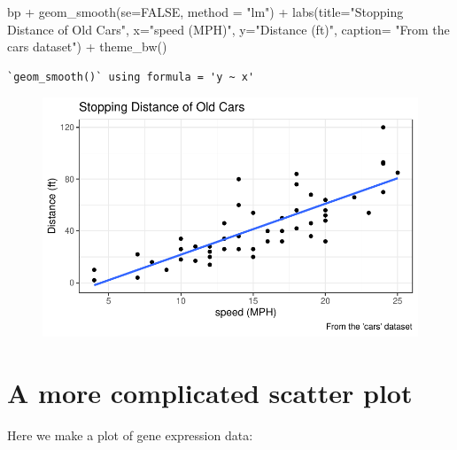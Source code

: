 \documentclass[
  letterpaper,
  DIV=11,
  numbers=noendperiod]{scrartcl}
\newenvironment{Shaded}{\begin{snugshade}}{\end{snugshade}}
\newcommand{\AttributeTok}[1]{\textcolor[rgb]{0.40,0.45,0.13}{#1}}
\newcommand{\ConstantTok}[1]{\textcolor[rgb]{0.56,0.35,0.01}{#1}}
\newcommand{\FunctionTok}[1]{\textcolor[rgb]{0.28,0.35,0.67}{#1}}
\newcommand{\NormalTok}[1]{\textcolor[rgb]{0.00,0.23,0.31}{#1}}
\newcommand{\SpecialCharTok}[1]{\textcolor[rgb]{0.37,0.37,0.37}{#1}}
\newcommand{\StringTok}[1]{\textcolor[rgb]{0.13,0.47,0.30}{#1}}
\begin{document}
\begin{Shaded}
\begin{Highlighting}[]
\NormalTok{bp }\SpecialCharTok{+} \FunctionTok{geom\_smooth}\NormalTok{(}\AttributeTok{se=}\ConstantTok{FALSE}\NormalTok{, }\AttributeTok{method =} \StringTok{"lm"}\NormalTok{) }\SpecialCharTok{+} \FunctionTok{labs}\NormalTok{(}\AttributeTok{title=}\StringTok{"Stopping Distance of Old Cars"}\NormalTok{, }\AttributeTok{x=}\StringTok{"speed (MPH)"}\NormalTok{, }\AttributeTok{y=}\StringTok{"Distance (ft)"}\NormalTok{, }\AttributeTok{caption=} \StringTok{"From the \textquotesingle{}cars\textquotesingle{} dataset"}\NormalTok{) }\SpecialCharTok{+} \FunctionTok{theme\_bw}\NormalTok{()}
\end{Highlighting}
\end{Shaded}

\begin{verbatim}
`geom_smooth()` using formula = 'y ~ x'
\end{verbatim}

\begin{figure}[H]

{\centering \includegraphics{./-class05_files/figure-pdf/unnamed-chunk-7-1.pdf}

}

\end{figure}

\hypertarget{a-more-complicated-scatter-plot}{%
\section{A more complicated scatter
plot}\label{a-more-complicated-scatter-plot}}

Here we make a plot of gene expression data:
\end{document}
